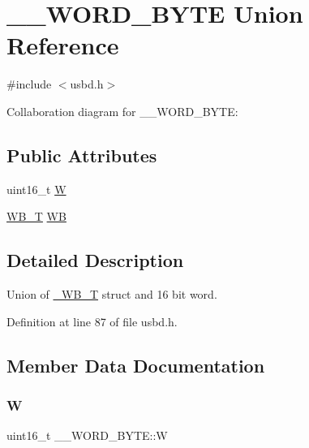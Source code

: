 \hypertarget{union_____w_o_r_d___b_y_t_e}{}\section{\+\_\+\+\_\+\+W\+O\+R\+D\+\_\+\+B\+Y\+TE Union Reference}
\label{union_____w_o_r_d___b_y_t_e}


{\ttfamily \#include $<$usbd.\+h$>$}



Collaboration diagram for \+\_\+\+\_\+\+W\+O\+R\+D\+\_\+\+B\+Y\+TE\+:
\subsection*{Public Attributes}
\begin{DoxyCompactItemize}
\item 
uint16\+\_\+t \hyperlink{union_____w_o_r_d___b_y_t_e_a90d5487c4190ce9c502f070f4a7a59e9}{W}
\item 
\hyperlink{group___u_s_b_d___core_ga4fbe30f5ac133f5bb15c653a19162ae9}{W\+B\+\_\+T} \hyperlink{union_____w_o_r_d___b_y_t_e_a3ea700711d4333320b15562bbf2ab59c}{WB}
\end{DoxyCompactItemize}


\subsection{Detailed Description}
Union of \hyperlink{struct___w_b___t}{\+\_\+\+W\+B\+\_\+T} struct and 16 bit word. 

Definition at line 87 of file usbd.\+h.



\subsection{Member Data Documentation}
\mbox{\label{union_____w_o_r_d___b_y_t_e_a90d5487c4190ce9c502f070f4a7a59e9}} 
\subsubsection{\texorpdfstring{W}{W}}
{\footnotesize\ttfamily uint16\+\_\+t \+\_\+\+\_\+\+W\+O\+R\+D\+\_\+\+B\+Y\+T\+E\+::W}

